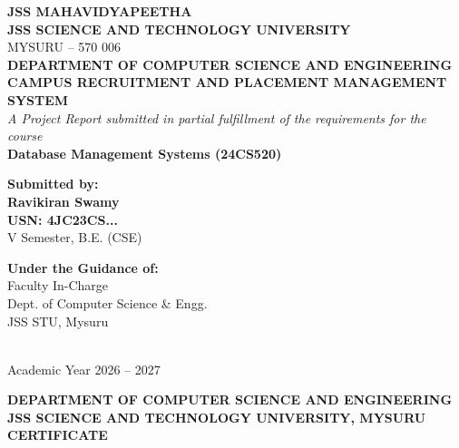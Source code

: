 \documentclass[12pt,a4paper]{report}
\begin{document}
\begin{titlepage}
    \centering
    \vspace*{0.5cm}
    {\Large\textbf{JSS MAHAVIDYAPEETHA}}\\[0.2cm]
    {\LARGE\textbf{JSS SCIENCE AND TECHNOLOGY UNIVERSITY}}\\[0.1cm]
    {\large MYSURU -- 570 006}\\[1.5cm]
    
    {\large\textbf{DEPARTMENT OF COMPUTER SCIENCE AND ENGINEERING}}\\[1.5cm]
    
    {\LARGE\textbf{CAMPUS RECRUITMENT AND PLACEMENT MANAGEMENT SYSTEM}}\\[0.5cm]
    {\large\textit{A Project Report submitted in partial fulfillment of the requirements for the course}}\\[0.3cm]
    {\large\textbf{Database Management Systems (24CS520)}}\\[1.5cm]
    
    \begin{minipage}{0.4\textwidth}
        \begin{flushleft} \large
            \textbf{Submitted by:}\\
            \textbf{Ravikiran Swamy}\\
            \textbf{USN: 4JC23CS...}\\
            V Semester, B.E. (CSE)
        \end{flushleft}
    \end{minipage}
    \hfill
    \begin{minipage}{0.4\textwidth}
        \begin{flushright} \large
            \textbf{Under the Guidance of:}\\
            Faculty In-Charge\\
            Dept. of Computer Science \& Engg.\\
            JSS STU, Mysuru
        \end{flushright}
    \end{minipage}\\[2.5cm]
    
    \vfill
    {\large Academic Year 2026 -- 2027}
\end{titlepage}

\newpage
\thispagestyle{empty}
\begin{center}
    {\Large\textbf{DEPARTMENT OF COMPUTER SCIENCE AND ENGINEERING}}\\[0.2cm]
    {\Large\textbf{JSS SCIENCE AND TECHNOLOGY UNIVERSITY, MYSURU}}\\[1.5cm]
    {\LARGE\textbf{CERTIFICATE}}\\[1.5cm]
\end{center}
\end{document}
